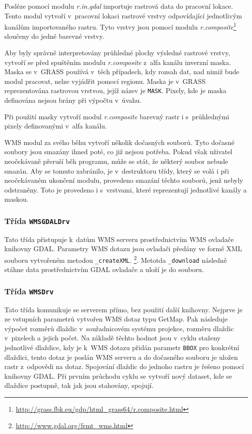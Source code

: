 \documentclass[a4paper,12pt]{article}
\begin{document}
Posléze pomocí modulu
\emph{r.in.gdal}
importuje rastrová data do pracovní lokace. Tento modul vytvoří v~pracovní
lokaci rastrové vrstvy odpovídající jednotlivým kanálům importovaného
rastru. Tyto vrstvy jsou pomocí modulu
\emph{r.composite}\footnote{\url{http://grass.fbk.eu/gdp/html_grass64/r.composite.html}}
sloučeny do jedné barevné vrstvy.

Aby byly správně interpretovány průhledné plochy výsledné rastrové
vrstvy, vytvoří se před spuštěním modulu \emph{r.composite} z~alfa kanálu
inverzní maska. Maska se v~GRASS používá v~těch případech, kdy rozsah
dat, nad nimiž bude modul pracovat, nelze vyjádřit pomocí
regionu. Maska je v~GRASS reprezentována rastrovou vrstvou, jejíž
název je {\tt MASK}. Pixely, kde je maska definována nejsou brány při
výpočtu v~úvahu.

Při použití masky vytvoří modul \emph{r.composite} barevný rastr i
s~průhlednými pixely definovanými v~alfa kanálu.

WMS modul za svého běhu vytvoří několik dočasných souborů. Tyto dočasné
soubory jsou smazány ihned poté, co již nejsou potřeba. Pokud však
uživatel neočekávaně přeruší běh programu, může se stát, že některý
soubor nebude smazán. Aby se tomuto zabránilo, je v~destruktoru třídy,
který se volá i při neočekávaném ukončení modulu, provedeno smazání
těchto souborů, jenž nebyly odstraněny. Toto je provedeno i
s~vrstvami, které reprezentují jednotlivé kanály a maskou.

\subsubsection{Třída {\tt \bfseries WMSGDALDrv}}

Tato třída přistupuje k~datům WMS serveru prostřednictvím WMS ovladače 
knihovny GDAL. Parametry WMS dotazu jsou ovladači předány ve formě XML
souboru vytvořeném metodou {\tt \_createXML}. 
 \footnote{\url{http://www.gdal.org/frmt_wms.html}}.  Metotda 
 {\tt \_download} následně stáhne data prostřednictvím GDAL ovladače a uloží 
 je do souboru.

\subsubsection{Třída {\tt \bfseries WMSDrv}}

Tato třída komunikuje se serverem přímo, bez použití další
knihovny. Nejprve je ze vstupních parametrů vytvořen WMS dotaz typu GetMap.
Pak následuje výpočet rozměrů dlaždic v~souřadnicovém systému projekce,
rozměru dlaždic v~pixelech a jejich počet. Na základě těchto hodnot
jsou v~cyklu staženy jednotlivé dlaždice, kdy je k~WMS dotazu přidán
parametr {\tt BBOX} pro konkrétní dlaždici, tento dotaz je poslán WMS
serveru a do dočasného souboru je uložen rastr z~odpovědi na dotaz. Spojování
dlaždic do jednoho rastru je řešeno pomocí knihovny GDAL. Při prvním
průchodu cyklu se vytvoří nový dataset, kde se dlaždice postupně, tak
jak jsou stahovány, spojují.
\end{document}
